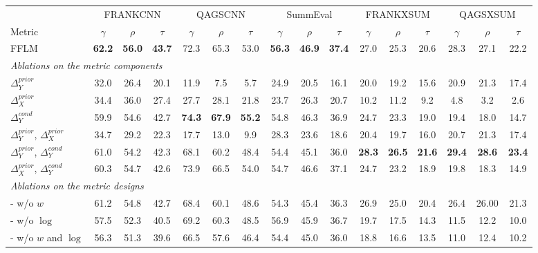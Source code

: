 \begin{table}[th]
	\scriptsize
	\centering
	\begin{tabular}{l|ccc|ccc|ccc|ccc|ccc}
		\toprule[1pt]
		& \multicolumn{3}{c}{FRANKCNN} & \multicolumn{3}{c}{QAGSCNN}  &  \multicolumn{3}{c}{SummEval}  & \multicolumn{3}{c}{FRANKXSUM}  & \multicolumn{3}{c}{QAGSXSUM} \\
		Metric & $\gamma$ &$\rho$ & $\tau$ & $\gamma$ &$\rho$ & $\tau$ & $\gamma$ &$\rho$ & $\tau$ & $\gamma$ &$\rho$ & $\tau$ & $\gamma$ &$\rho$ & $\tau$ \\
		\hline
		FFLM &  \textbf{62.2} & \textbf{56.0} & \textbf{43.7} & 72.3 & 65.3 & 53.0 & \textbf{56.3} & \textbf{46.9} & \textbf{37.4} & 27.0 & 25.3 & 20.6 & 28.3 & 27.1 & 22.2 \\
		
		\hline
		\multicolumn{16}{l}{\textit{Ablations on the metric components}} \\
		$\Delta_Y^{prior}$ & 32.0 & 26.4 & 20.1 & 11.9 & 7.5 & 5.7 & 24.9 & 20.5 & 16.1 & 20.0 & 19.2 & 15.6 & 20.9 & 21.3 & 17.4 \\
		$\Delta_X^{prior}$ & 34.4 & 36.0 & 27.4 & 27.7 & 28.1 & 21.8 & 23.7 & 26.3 & 20.7 & 10.2 & 11.2 & 9.2 & 4.8 & 3.2 & 2.6 \\
		$\Delta_Y^{cond}$ & 59.9 & 54.6 & 42.7 & \textbf{74.3} & \textbf{67.9} & \textbf{55.2} & 54.8 & 46.3 & 36.9 & 24.7 & 23.3 & 19.0 & 19.4 & 18.0 & 14.7\\
		$\Delta_Y^{prior}$, $\Delta_X^{prior}$& 34.7 & 29.2 & 22.3 & 17.7 & 13.0 & 9.9 & {28.3} & {23.6} & {18.6} & 20.4 & 19.7 & 16.0 & 20.7 & 21.3 & 17.4 \\ 
		$\Delta_Y^{prior}$, $\Delta_Y^{cond}$ & 61.0 & 54.2 & 42.3 &  68.1 & 60.2 & 48.4 & 54.4 & 45.1 & 36.0 & \textbf{28.3} & \textbf{26.5} & \textbf{21.6} & \textbf{29.4 }& \textbf{28.6} & \textbf{23.4}\\
		$\Delta_X^{prior}$, $\Delta_Y^{cond}$ & 60.3 & 54.7 & 42.6 & 73.9 & 66.5 & 54.0 & 54.7 & 46.6 & 37.1 & 24.7 & 23.2 & 18.9 & 19.8 & 18.3 & 14.9 \\
		
		
		\hline
		\multicolumn{16}{l}{\textit{Ablations on the metric designs} }\\
		- w/o $w$ & 61.2 &  54.8 & 42.7 & 68.4 & 60.1 & 48.6 & 54.3 & 45.4 & 36.3 & 26.9 & 25.0 & 20.4 & 26.4 & 26.00 & 21.3 \\
		- w/o $\log$ & 57.5 & 52.3 & 40.5 & 69.2 & 60.3 & 48.5 & 56.9 & 45.9 & 36.7 & 19.7 & 17.5 & 14.3 & 11.5 & 12.2 & 10.0\\
		- w/o $w$ and $\log$ & 56.3 & 51.3 & 39.6 & 66.5 & 57.6 & 46.4 & 54.4 & 45.0 & 36.0 & 18.8 & 16.6 & 13.5 & 11.0 & 12.4 & 10.2 \\
		

\end{tabular}
\end{table}
